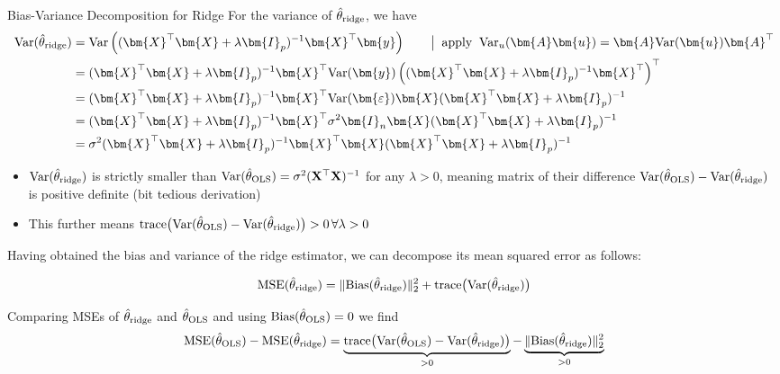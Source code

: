 \documentclass[11pt,compress,t,notes=noshow, xcolor=table]{beamer}
\begin{document}
\begin{vbframe}{Bias-Variance Decomposition for Ridge}
    For the variance of $\hat{\theta}_{\text{ridge}}$, we have
    \begin{equation*}
        \begin{aligned}
            \text{Var}(\thetah_{\text{ridge}})  &= \text{Var}\left((\bm{X}^{\top}\bm{X} +\lambda\bm{I}_p )^{-1} \bm{X}^{\top}\bm{y}\right) \quad \quad \big| \;\; \text{apply} \;\; \text{Var}_u(\bm{A}\bm{u}) = \bm{A} \text{Var}(\bm{u}) \bm{A}^{\top} \\
            &= (\bm{X}^{\top}\bm{X} +\lambda\bm{I}_p )^{-1} \bm{X}^{\top} \text{Var}(\bm{y}) \left( (\bm{X}^{\top}\bm{X} +\lambda\bm{I}_p )^{-1} \bm{X}^{\top} \right)^{\top} \\
            &= (\bm{X}^{\top}\bm{X} +\lambda\bm{I}_p )^{-1} \bm{X}^{\top} \text{Var}(\bm{\varepsilon}) \bm{X} (\bm{X}^{\top}\bm{X} +\lambda\bm{I}_p )^{-1}  \\
            &=  (\bm{X}^{\top}\bm{X} +\lambda\bm{I}_p )^{-1} \bm{X}^{\top} \sigma^2 \bm{I}_n \bm{X} (\bm{X}^{\top}\bm{X} +\lambda\bm{I}_p )^{-1}  \\
            &= \sigma^2 (\bm{X}^{\top}\bm{X} +\lambda\bm{I}_p )^{-1} \bm{X}^{\top} \bm{X} (\bm{X}^{\top}\bm{X} +\lambda\bm{I}_p )^{-1}  \\
        \end{aligned}
    \end{equation*}

\begin{itemize}
    \item $\text{Var}(\hat{\theta}_{\text{ridge}})$ is strictly smaller than $\text{Var}(\hat{\theta}_{\text{OLS}})=\sigma^2 (\mathbf{X}^{\top}\mathbf{X})^{-1}$ for any $\lambda>0$, meaning matrix of their difference $\text{Var}(\hat{\theta}_{\text{OLS}})-\text{Var}(\hat{\theta}_{\text{ridge}})$ is positive definite (bit tedious derivation)
    \item This further means $\text{trace}\big({\text{Var}(\hat{\theta}_{\text{OLS}})}-{\text{Var}(\hat{\theta}_{\text{ridge}})}\big)>0 \, \forall \lambda>0$
\end{itemize}

\framebreak

Having obtained the bias and variance of the ridge estimator, we can decompose its mean squared error as follows:

$$\text{MSE}(\hat{\theta}_{\text{ridge}})=\Vert \text{Bias}(\hat{\theta}_{\text{ridge}})\Vert_2^2 + \text{trace}\big(\text{Var}(\hat{\theta}_{\text{ridge}})\big)$$

Comparing MSEs of $\hat{\theta}_{\text{ridge}}$ and $\hat{\theta}_{\text{OLS}}$ and using $\text{Bias}(\hat{\theta}_{\text{OLS}})=0$ we find 
$$\text{MSE}(\hat{\theta}_{\text{OLS}})-\text{MSE}(\hat{\theta}_{\text{ridge}}) = \underbrace{\text{trace}\big({\text{Var}(\hat{\theta}_{\text{OLS}})}-{\text{Var}(\hat{\theta}_{\text{ridge}})}\big)}_{>0} - \underbrace{\Vert \text{Bias}(\hat{\theta}_{\text{ridge}})\Vert_2^2}_{>0}$$


\end{vbframe}
\end{document}
